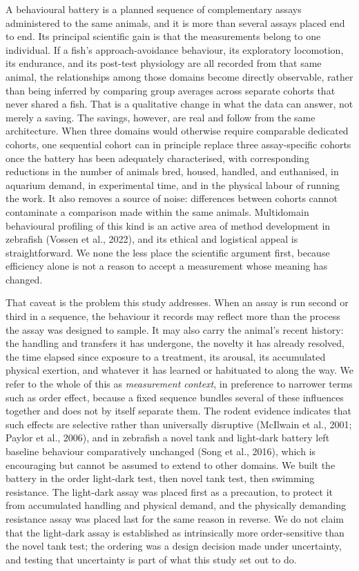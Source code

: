 \documentclass[12pt,a4paper]{article}
\begin{document}
A behavioural battery is a planned sequence of complementary assays administered to the same animals, and it is more than several assays placed end to end. Its principal scientific gain is that the measurements belong to one individual. If a fish's approach-avoidance behaviour, its exploratory locomotion, its endurance, and its post-test physiology are all recorded from that same animal, the relationships among those domains become directly observable, rather than being inferred by comparing group averages across separate cohorts that never shared a fish. That is a qualitative change in what the data can answer, not merely a saving. The savings, however, are real and follow from the same architecture. When three domains would otherwise require comparable dedicated cohorts, one sequential cohort can in principle replace three assay-specific cohorts once the battery has been adequately characterised, with corresponding reductions in the number of animals bred, housed, handled, and euthanised, in aquarium demand, in experimental time, and in the physical labour of running the work. It also removes a source of noise: differences between cohorts cannot contaminate a comparison made within the same animals. Multidomain behavioural profiling of this kind is an active area of method development in zebrafish (Vossen et al., 2022), and its ethical and logistical appeal is straightforward. We none the less place the scientific argument first, because efficiency alone is not a reason to accept a measurement whose meaning has changed.

That caveat is the problem this study addresses. When an assay is run second or third in a sequence, the behaviour it records may reflect more than the process the assay was designed to sample. It may also carry the animal's recent history: the handling and transfers it has undergone, the novelty it has already resolved, the time elapsed since exposure to a treatment, its arousal, its accumulated physical exertion, and whatever it has learned or habituated to along the way. We refer to the whole of this as \textit{measurement context}, in preference to narrower terms such as order effect, because a fixed sequence bundles several of these influences together and does not by itself separate them. The rodent evidence indicates that such effects are selective rather than universally disruptive (McIlwain et al., 2001; Paylor et al., 2006), and in zebrafish a novel tank and light-dark battery left baseline behaviour comparatively unchanged (Song et al., 2016), which is encouraging but cannot be assumed to extend to other domains. We built the battery in the order light-dark test, then novel tank test, then swimming resistance. The light-dark assay was placed first as a precaution, to protect it from accumulated handling and physical demand, and the physically demanding resistance assay was placed last for the same reason in reverse. We do not claim that the light-dark assay is established as intrinsically more order-sensitive than the novel tank test; the ordering was a design decision made under uncertainty, and testing that uncertainty is part of what this study set out to do.
\end{document}
